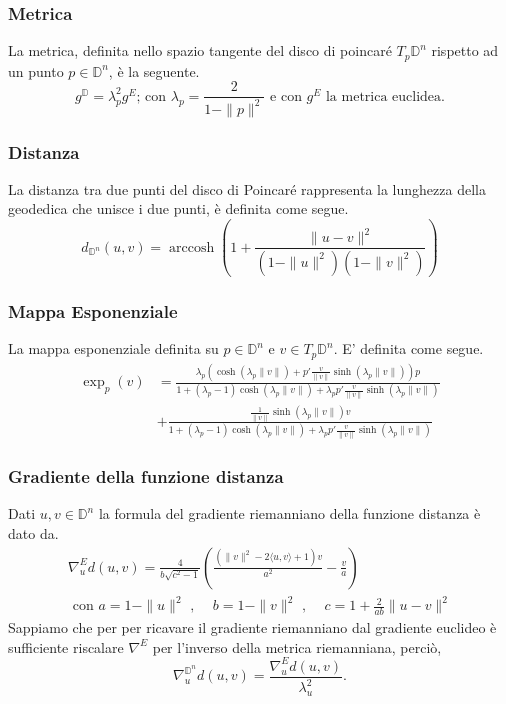 \documentclass[a4paper, 12pt]{article}
\DeclareMathOperator\arccosh{arccosh}
\begin{document}
\subsubsection{Metrica}
La metrica, definita nello spazio tangente del disco di poincaré $T_p\mathbb{D}^n$ rispetto ad un punto $p \in \mathbb{D}^n$, è la seguente.\\
\[g^\mathbb{D} = \lambda_p^2 g^E \mbox{; con } \lambda_p = \frac{2}{1- \parallel p \parallel^2} \mbox{ e con } g^E \mbox{ la metrica euclidea}.\]
\subsubsection{Distanza}
La distanza tra due punti del disco di Poincaré rappresenta la lunghezza della geodedica che unisce i due punti, è definita come segue.\\
\[d_{\mathbb{D}^n}(u, v) = \arccosh \left(1 + \frac{\| u - v\|^2}{(1-\| u \|^2)(1-\| v \|^2)} \right)\]
\subsubsection{Mappa Esponenziale}
La mappa esponenziale definita su $p \in \mathbb{D}^n$ e $v \in T_p\mathbb{D}^n$. E' definita come segue.\\
\begin{equation*}\begin{split}
\exp_p(v) &= \frac{\lambda_p (\cosh(\lambda_p \| v \|) + p'\frac{v}{\| v \|} \sinh(\lambda_p \| v \|))p}{1 + (\lambda_p - 1) \cosh(\lambda_p \| v \|) + \lambda_p p ' \frac{v}{\| v \|} \sinh(\lambda_p \| v \|)} \\
&+ \frac{\frac{1}{\| v \|} \sinh(\lambda_p \| v \|) v}{1 + (\lambda_p - 1) \cosh(\lambda_p \| v \|) + \lambda_p p' \frac{v}{\| v \|} \sinh(\lambda_p \| v \|)}
\end{split}\end{equation*}
\subsubsection{Gradiente della funzione distanza}
Dati $u,v \in \mathbb{D}^n$ la formula del gradiente riemanniano della funzione distanza è dato da.\\
\begin{equation*}\begin{gathered}
\nabla_u^{E} d(u,v) = \frac{4}{b \sqrt{c^2 - 1}} \left(\frac{(\| v \|^2 - 2\langle u,v \rangle + 1)v}{a^2} - \frac{v}{a}\right) \\ \mbox{ con } a = 1 - \| u \|^2 \mbox{ , } \quad b = 1 - \| v \|^2 \mbox{ , } \quad c = 1 + \frac{2}{ab} \| u - v \|^2
\end{gathered}\end{equation*}
Sappiamo che per per ricavare il gradiente riemanniano dal gradiente euclideo è sufficiente riscalare $\nabla^E$ per l'inverso della metrica riemanniana, perciò,\\ \[\nabla_u^{\mathbb{D}^n} d(u,v) = \frac{\nabla_u^{E} d(u,v)}{\lambda_u^2}.\]
\end{document}

